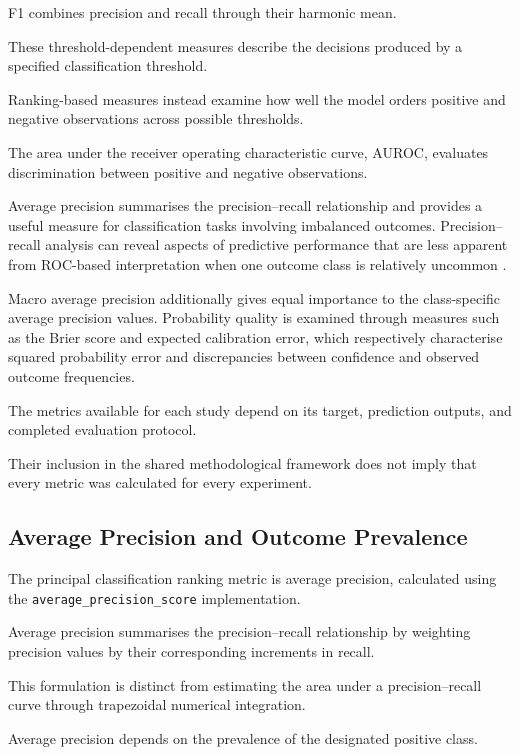 F1 combines precision and recall through their harmonic mean.

These threshold-dependent measures describe the decisions produced by a specified classification threshold.

Ranking-based measures instead examine how well the model orders positive and negative observations across possible thresholds.

The area under the receiver operating characteristic curve, AUROC, evaluates discrimination between positive and negative observations.

Average precision summarises the precision–recall relationship and provides a useful measure for classification tasks involving imbalanced outcomes. Precision–recall analysis can reveal aspects of predictive performance that are less apparent from ROC-based interpretation when one outcome class is relatively uncommon \parencite{Saito2015PrecisionRecall}.

Macro average precision additionally gives equal importance to the class-specific average precision values. Probability quality is examined through measures such as the Brier score and expected calibration error, which respectively characterise squared probability error and discrepancies between confidence and observed outcome frequencies.

The metrics available for each study depend on its target, prediction outputs, and completed evaluation protocol.

Their inclusion in the shared methodological framework does not imply that every metric was calculated for every experiment.

\subsection{Average Precision and Outcome Prevalence}

The principal classification ranking metric is average precision, calculated using the \texttt{average\_precision\_score} implementation.

Average precision summarises the precision–recall relationship by weighting precision values by their corresponding increments in recall.

This formulation is distinct from estimating the area under a precision–recall curve through trapezoidal numerical integration.

Average precision depends on the prevalence of the designated positive class.

